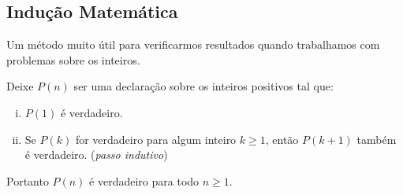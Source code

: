 \subsection{Indução Matemática}
Um método muito útil para verificarmos resultados quando trabalhamos com problemas sobre os inteiros.
\begin{theorem}
    Deixe $P(n)$ ser uma declaração sobre os inteiros positivos tal que:
    \begin{enumerate}[i.]
        \item $P(1)$ é verdadeiro.
        \item Se $P(k)$ for verdadeiro para algum inteiro $k \geq 1$, então $P(k+1)$ também é verdadeiro. (\textit{passo indutivo})
    \end{enumerate}
    Portanto $P(n)$ é verdadeiro para todo $n \geq 1 $.
\end{theorem}



